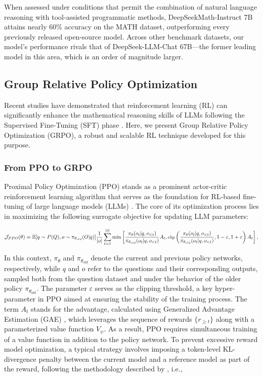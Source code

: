 \begin{itemize}[topsep=0pt]
\begin{itemize}[topsep=0pt]
When assessed under conditions that permit the combination of natural language reasoning with tool-assisted programmatic methods, DeepSeekMath-Instruct 7B attains nearly 60\% accuracy on the MATH dataset, outperforming every previously released open-source model. Across other benchmark datasets, our model's performance rivals that of DeepSeek-LLM-Chat 67B—the former leading model in this area, which is an order of magnitude larger.

\subsection{Group Relative Policy Optimization} Recent studies have demonstrated that reinforcement learning (RL) can significantly enhance the mathematical reasoning skills of LLMs following the Supervised Fine-Tuning (SFT) phase \citep{wang2023math,wizardmath}. Here, we present Group Relative Policy Optimization (GRPO), a robust and scalable RL technique developed for this purpose.

\subsubsection{From PPO to GRPO} Proximal Policy Optimization (PPO) \citep{schulman2017proximal} stands as a prominent actor-critic reinforcement learning algorithm that serves as the foundation for RL-based fine-tuning of large language models (LLMs) \citep{ouyang2022training}. The core of its optimization process lies in maximizing the following surrogate objective for updating LLM parameters:

\begin{equation}
\footnotesize
    \mathcal{J}_{PPO}(\theta) = \mathbb{E}{[q \sim P(Q), o \sim \pi_{\theta_{old}}(O|q)]} \frac{1}{|o|} \sum_{t=1}^{|o|} \min \left[ \frac{\pi_\theta(o_{t} | q, o_{<t})}{\pi_{\theta_{old}}(o_{t} | q, o_{<t})} A_{t}, \text{clip} \left( \frac{\pi_\theta(o_{t} | q, o_{<t})}{\pi_{\theta_{old}}(o_{t} | q, o_{<t})}, 1 - \varepsilon, 1 + \varepsilon \right)  A_{t} \right] ,
\end{equation}

In this context, $\pi_{\theta}$ and $\pi_{\theta_{old}}$ denote the current and previous policy networks, respectively, while $q$ and $o$ refer to the questions and their corresponding outputs, sampled both from the question dataset and under the behavior of the older policy $\pi_{\theta_{old}}$. The parameter $\varepsilon$ serves as the clipping threshold, a key hyper-parameter in PPO aimed at ensuring the stability of the training process. The term $A_t$ stands for the advantage, calculated using Generalized Advantage Estimation (GAE) \citep{gae}, which leverages the sequence of rewards $\{r_{\ge t}\}$ along with a parameterized value function $V_{\psi}$. As a result, PPO requires simultaneous training of a value function in addition to the policy network. To prevent excessive reward model optimization, a typical strategy involves imposing a token-level KL-divergence penalty between the current model and a reference model as part of the reward, following the methodology described by \citet{ouyang2022training}, i.e.,


\end{itemize}
\end{itemize}
